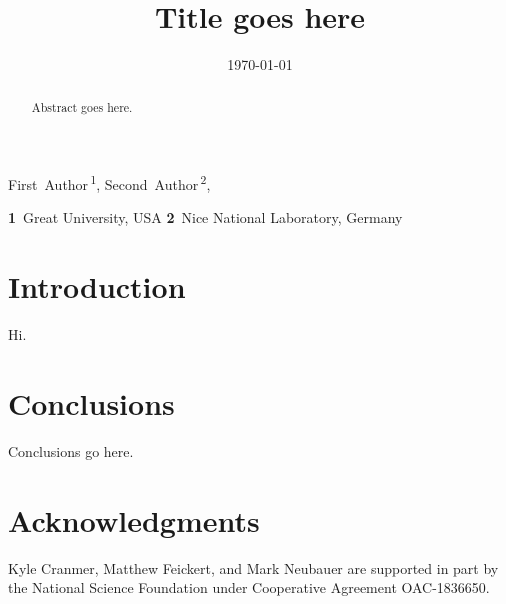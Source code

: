 \documentclass[11pt]{article}
\begin{document}
\title{\textbf{Title goes here}}

\date{\today}

\begin{center}
First~Author\,\textsuperscript{1},
Second~Author\,\textsuperscript{2},
\end{center}

\begin{center}
\textbf{1}~Great University, USA
\textbf{2}~Nice National Laboratory, Germany
\end{center}

\begin{abstract}
\noindent Abstract goes here.
\end{abstract}


\section{Introduction}

Hi.~\cite{LHCReinterpretationForum:2020xtr}

\section{Conclusions}

Conclusions go here.

\section*{Acknowledgments}

Kyle Cranmer, Matthew Feickert, and Mark Neubauer are supported in part by the National Science Foundation under Cooperative Agreement OAC-1836650.

\def\thefootnote{\fnsymbol{footnote}}
\setcounter{footnote}{0}

\clearpage
{}


\end{document}
